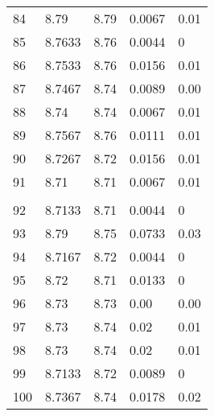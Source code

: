\begin{tabular}{lllll}
84 & 8.79 & 8.79 & 0.0067 & 0.01   \\
85 & 8.7633 & 8.76 & 0.0044 & 0   \\
86 & 8.7533 & 8.76 & 0.0156 & 0.01   \\
87 & 8.7467 & 8.74 & 0.0089 & 0.00   \\
88 & 8.74 & 8.74 & 0.0067 & 0.01   \\
89 & 8.7567 & 8.76 & 0.0111 & 0.01   \\
90 & 8.7267 & 8.72 & 0.0156 & 0.01   \\
91 & 8.71 & 8.71 & 0.0067 & 0.01   \\
\\
92 & 8.7133 & 8.71 & 0.0044 & 0   \\
93 & 8.79 & 8.75 & 0.0733 & 0.03   \\
94 & 8.7167 & 8.72 & 0.0044 & 0   \\
95 & 8.72 & 8.71 & 0.0133 & 0   \\
96 & 8.73 & 8.73 & 0.00 & 0.00   \\
97 & 8.73 & 8.74 & 0.02 & 0.01   \\
98 & 8.73 & 8.74 & 0.02 & 0.01   \\
99 & 8.7133 & 8.72 & 0.0089 & 0   \\
100 & 8.7367 & 8.74 & 0.0178 & 0.02   \\

\hline
\end{tabular}
